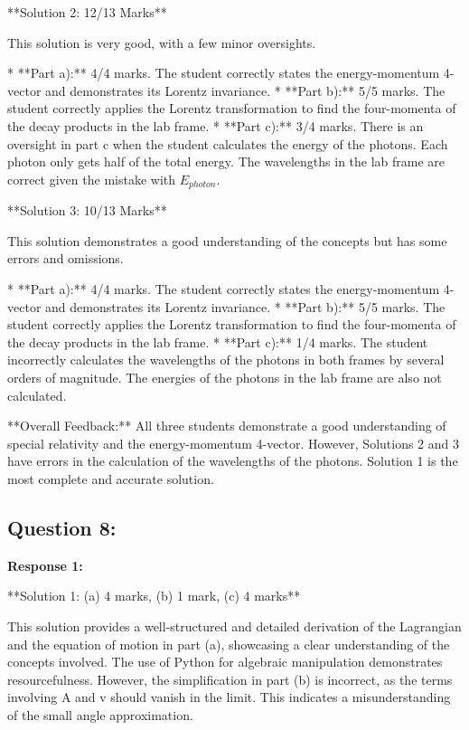 \documentclass[a4paper,11pt]{article}
\begin{document}
**Solution 2: 12/13 Marks**

This solution is very good, with a few minor oversights.

*   **Part a):** 4/4 marks. The student correctly states the energy-momentum 4-vector and demonstrates its Lorentz invariance.
*   **Part b):** 5/5 marks. The student correctly applies the Lorentz transformation to find the four-momenta of the decay products in the lab frame.
*   **Part c):** 3/4 marks. There is an oversight in part c when the student calculates the energy of the photons. Each photon only gets half of the total energy. The wavelengths in the lab frame are correct given the mistake with \(E_{photon}\). 


**Solution 3: 10/13 Marks**

This solution demonstrates a good understanding of the concepts but has some errors and omissions.

*   **Part a):** 4/4 marks. The student correctly states the energy-momentum 4-vector and demonstrates its Lorentz invariance.
*   **Part b):** 5/5 marks. The student correctly applies the Lorentz transformation to find the four-momenta of the decay products in the lab frame.
*   **Part c):** 1/4 marks. The student incorrectly calculates the wavelengths of the photons in both frames by several orders of magnitude. The energies of the photons in the lab frame are also not calculated.

**Overall Feedback:**
All three students demonstrate a good understanding of special relativity and the energy-momentum 4-vector. However, Solutions 2 and 3 have errors in the calculation of the wavelengths of the photons. Solution 1 is the most complete and accurate solution.

\subsection*{Question 8:}

\textbf{Response 1:}

**Solution 1: (a) 4 marks, (b) 1 mark, (c) 4 marks**

This solution provides a well-structured and detailed derivation of the Lagrangian and the equation of motion in part (a), showcasing a clear understanding of the concepts involved. The use of Python for algebraic manipulation demonstrates resourcefulness. However, the simplification in part (b) is incorrect, as the terms involving A and v should vanish in the limit. This indicates a misunderstanding of the small angle approximation.
\end{document}
